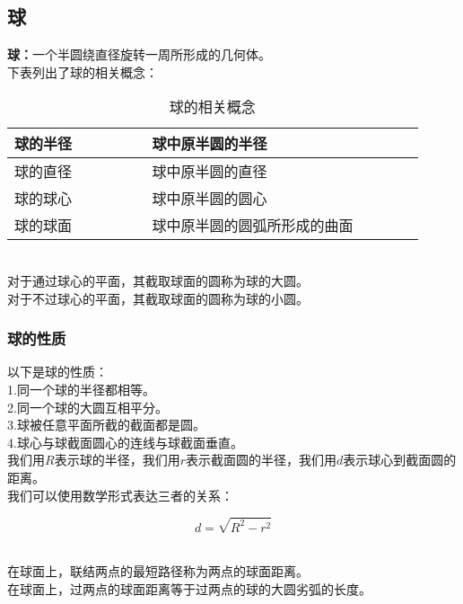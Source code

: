 \documentclass[UTF8]{ctexart}
\begin{document}
\subsection{球}
    \textbf{球：}一个半圆绕直径旋转一周所形成的几何体。\\[3mm]
    下表列出了球的相关概念：\vspace{5pt}
    \begin{table}[h]
        \begin{center}
            \begin{tabular}{l|l}
                \hline
                球的半径~~~~~~~~&球中原半圆的半径~~~~~~~~\\ \hline
                球的直径~~~~~~~~&球中原半圆的直径~~~~~~~~\\ \hline
                球的球心~~~~~~~~&球中原半圆的圆心~~~~~~~~\\ \hline
                球的球面~~~~~~~~&球中原半圆的圆弧所形成的曲面~~~~~~~~\\ \hline
            \end{tabular}
            \caption{球的相关概念}
        \end{center}
    \end{table}\\
    对于通过球心的平面，其截取球面的圆称为球的大圆。\\[3mm]
    对于不过球心的平面，其截取球面的圆称为球的小圆。\\

\subsubsection{球的性质}
    以下是球的性质：\\[3mm]
    1.同一个球的半径都相等。\\[3mm]
    2.同一个球的大圆互相平分。\\[3mm]
    3.球被任意平面所截的截面都是圆。\\[3mm]
    4.球心与球截面圆心的连线与球截面垂直。\\[6mm]
    我们用$R$表示球的半径，我们用$r$表示截面圆的半径，我们用$d$表示球心到截面圆的距离。\\[3mm]
    我们可以使用数学形式表达三者的关系：
    \begin{large}
        \begin{equation*}
            d=\sqrt{R^2-r^2}
        \end{equation*}
    \end{large}\\
    在球面上，联结两点的最短路径称为两点的球面距离。\\[3mm]
    在球面上，过两点的球面距离等于过两点的球的大圆劣弧的长度。
\end{document}
